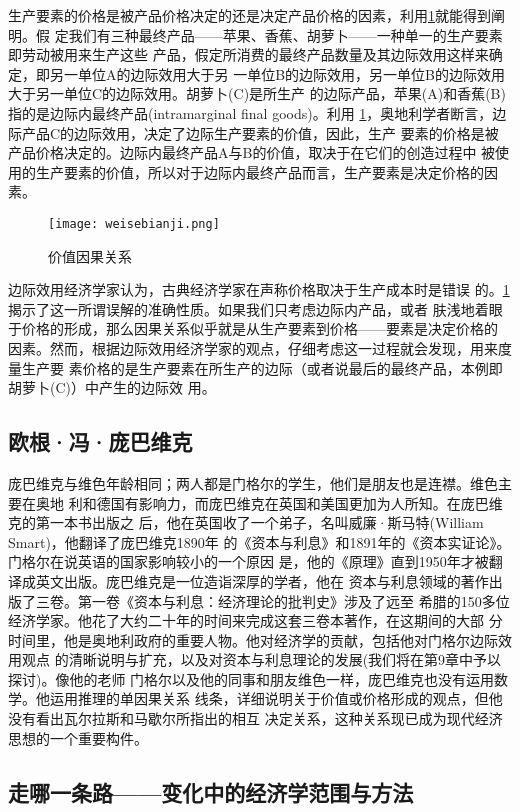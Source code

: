 生产要素的价格是被产品价格决定的还是决定产品价格的因素，利用\cref{fig:weise}就能得到阐明。假
定我们有三种最终产品——苹果、香蕉、胡萝卜——一种单一的生产要素即劳动被用来生产这些
产品，假定所消费的最终产品数量及其边际效用这样来确定，即另一单位A的边际效用大于另
一单位B的边际效用，另一单位B的边际效用大于另一单位C的边际效用。胡萝卜(C)是所生产
的边际产品，苹果(A)和香蕉(B)指的是边际内最终产品(intramarginal final goods)。利用
\cref{fig:weise}，奥地利学者断言，边际产品C的边际效用，决定了边际生产要素的价值，因此，生产
要素的价格是被产品价格决定的。边际内最终产品A与B的价值，取决于在它们的创造过程中
被使用的生产要素的价值，所以对于边际内最终产品而言，生产要素是决定价格的因素。
\begin{figure}[ht]
  \centering
  \texttt{[image: weisebianji.png]}
  \caption{\label{fig:weise}价值因果关系}
\end{figure}

边际效用经济学家认为，古典经济学家在声称价格取决于生产成本时是错误
的。\cref{fig:weise}揭示了这一所谓误解的准确性质。如果我们只考虑边际内产品，或者
肤浅地着眼于价格的形成，那么因果关系似乎就是从生产要素到价格——要素是决定价格的
因素。然而，根据边际效用经济学家的观点，仔细考虑这一过程就会发现，用来度量生产要
素价格的是生产要素在所生产的边际（或者说最后的最终产品，本例即胡萝卜(C)）中产生的边际效
用。

\subsection{欧根·冯·庞巴维克}

庞巴维克与维色年龄相同；两人都是门格尔的学生，他们是朋友也是连襟。维色主要在奥地
利和德国有影响力，而庞巴维克在英国和美国更加为人所知。在庞巴维克的第一本书出版之
后，他在英国收了一个弟子，名叫威廉·斯马特(William Smart)，他翻译了庞巴维克1890年
的《资本与利息》和1891年的《资本实证论》。门格尔在说英语的国家影响较小的一个原因
是，他的《原理》直到1950年才被翻译成英文出版。庞巴维克是一位造诣深厚的学者，他在
资本与利息领域的著作出版了三卷。第一卷《资本与利息：经济理论的批判史》涉及了远至
希腊的150多位经济学家。他花了大约二十年的时间来完成这套三卷本著作，在这期间的大部
分时间里，他是奥地利政府的重要人物。他对经济学的贡献，包括他对门格尔边际效用观点
的清晰说明与扩充，以及对资本与利息理论的发展(我们将在第9章中予以探讨)。像他的老师
门格尔以及他的同事和朋友维色一样，庞巴维克也没有运用数学。他运用推理的单因果关系
线条，详细说明关于价值或价格形成的观点，但他没有看出瓦尔拉斯和马歇尔所指出的相互
决定关系，这种关系现已成为现代经济思想的一个重要构件。

\subsection{走哪一条路——变化中的经济学范围与方法}


